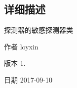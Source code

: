 \subsection{详细描述}
探测器的敏感探测器类 

\begin{DoxyAuthor}{作者}
loyxin 
\end{DoxyAuthor}
\begin{DoxyVersion}{版本}
1. 
\end{DoxyVersion}
\begin{DoxyDate}{日期}
2017-\/09-\/10 
\end{DoxyDate}
